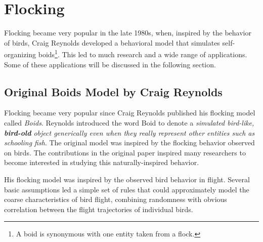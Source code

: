 





\section{Flocking}
Flocking became very popular in the late 1980s, when, inspired by the behavior of birds, Craig Reynolds developed a behavioral model that simulates self-organizing boids\footnote{A boid is synonymous with one entity taken from a flock.}. This led to much research and a wide range of applications. Some of these applications will be discussed in the following section.  

\subsection{Original Boids Model by Craig Reynolds}
Flocking became very popular since Craig Reynolds published his flocking model called \textit{Boids}\cite{craig1}. Reynolds introduced the word Boid to denote a \textit{simulated bird-like, \textbf{bird-old} object generically even when they really represent other entities such as schooling fish}. The original model was inspired by the flocking behavior observed on birds. The contributions in the original paper inspired many researchers to become interested in studying this naturally-inspired behavior.

His flocking model was inspired by the observed bird behavior in flight. Several basic assumptions led a simple set of rules that could approximately model the coarse characteristics of bird flight, combining randomness with obvious correlation between the flight trajectories of individual birds.  

